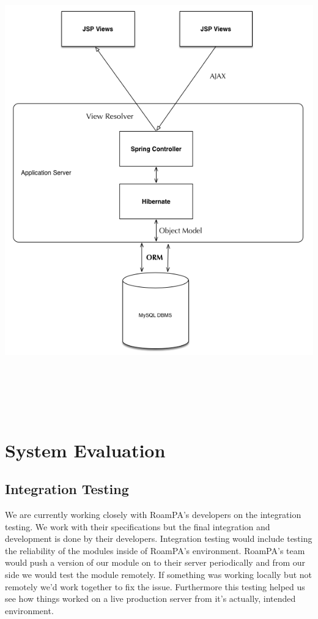 \begin{center}    
	\includegraphics[height=20cm, width=15cm]{img/architecture.png}
\end{center}

\chapter{System Evaluation}

\section{Integration Testing}

We are currently working closely with RoamPA's developers on the integration testing. We work with their specifications but the final integration and development is done by their developers. Integration testing would include testing the reliability of the modules inside of RoamPA's environment. RoamPA's team would push a version of our module on to their server periodically and from our side we would test the module remotely. If something was working locally but not remotely we'd work together to fix the issue. Furthermore this testing helped us see how things worked on a live production server from it's actually, intended environment.


